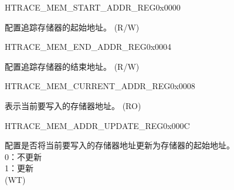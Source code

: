 \begin{register}{H}{TRACE\_MEM\_START\_ADDR\_REG}{0x0000}\label{regdesc:TRACEMEMSTARTADDRREG}
%
\regnewline%
\begin{regdesc}\begin{reglist}
\label{fielddesc:TRACEMEMSTARTADDR}\item [TRACE\_MEM\_START\_ADDR] 配置追踪存储器的起始地址。 (R/W)
\end{reglist}\end{regdesc}
\end{register}


\begin{register}{H}{TRACE\_MEM\_END\_ADDR\_REG}{0x0004}\label{regdesc:TRACEMEMENDADDRREG}
%
\regnewline%
\begin{regdesc}\begin{reglist}
\label{fielddesc:TRACEMEMENDADDR}\item [TRACE\_MEM\_END\_ADDR] 配置追踪存储器的结束地址。 (R/W)
\end{reglist}\end{regdesc}
\end{register}


\begin{register}{H}{TRACE\_MEM\_CURRENT\_ADDR\_REG}{0x0008}\label{regdesc:TRACEMEMCURRENTADDRREG}
%
\regnewline%
\begin{regdesc}\begin{reglist}
\label{fielddesc:TRACEMEMCURRENTADDR}\item [TRACE\_MEM\_CURRENT\_ADDR] 表示当前要写入的存储器地址。 (RO)
\end{reglist}\end{regdesc}
\end{register}


\begin{register}{H}{TRACE\_MEM\_ADDR\_UPDATE\_REG}{0x000C}\label{regdesc:TRACEMEMADDRUPDATEREG}
%
%
\regnewline%
\begin{regdesc}\begin{reglist}
\label{fielddesc:TRACEMEMCURRENTADDRUPDATE}\item [TRACE\_MEM\_CURRENT\_ADDR\_UPDATE] 配置是否将当前要写入的存储器地址更新为存储器的起始地址。\\
0：不更新\\
1：更新\\(WT)
\end{reglist}\end{regdesc}
\end{register}



